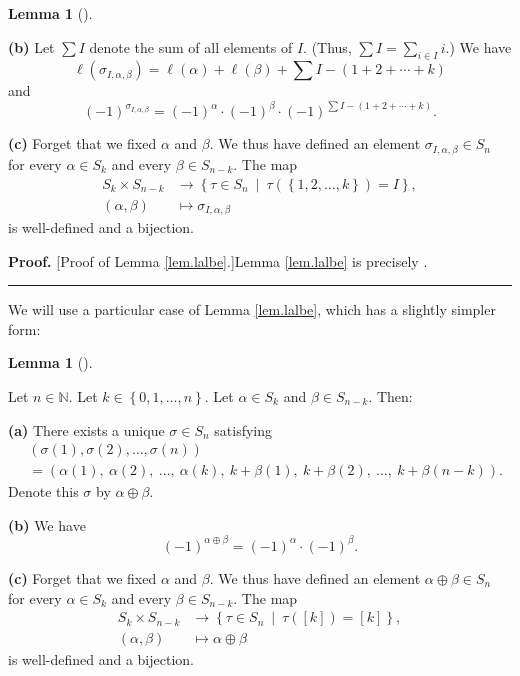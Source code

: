 \documentclass[numbers=enddot,12pt,final,onecolumn,notitlepage,english]{scrartcl}%
\theoremstyle{definition}
\newtheorem{lem}[theo]{Lemma}
\newenvironment{lemma}[1][]
{\begin{lem}[#1]\begin{leftbar}}
{\end{leftbar}\end{lem}}
\newenvironment{proof}[1][Proof]{\noindent\textbf{#1.} }{\ \rule{0.5em}{0.5em}}
\let\sumnonlimits\sum
\renewcommand{\sum}{\sumnonlimits\limits}
\newenvironment{verlong}{}{}
\begin{document}
\begin{verlong}
\begin{lemma}
\textbf{(b)} Let $\sum I$ denote the sum of all elements of $I$. (Thus, $\sum
I=\sum_{i\in I}i$.) We have%
\[
\ell\left(  \sigma_{I,\alpha,\beta}\right)  =\ell\left(  \alpha\right)
+\ell\left(  \beta\right)  +\sum I-\left(  1+2+\cdots+k\right)
\]
and%
\[
\left(  -1\right)  ^{\sigma_{I,\alpha,\beta}}=\left(  -1\right)  ^{\alpha
}\cdot\left(  -1\right)  ^{\beta}\cdot\left(  -1\right)  ^{\sum I-\left(
1+2+\cdots+k\right)  }.
\]


\textbf{(c)} Forget that we fixed $\alpha$ and $\beta$. We thus have defined
an element $\sigma_{I,\alpha,\beta}\in S_{n}$ for every $\alpha\in S_{k}$ and
every $\beta\in S_{n-k}$. The map%
\begin{align*}
S_{k}\times S_{n-k}  &  \rightarrow\left\{  \tau\in S_{n}\ \mid\ \tau\left(
\left\{  1,2,\ldots,k\right\}  \right)  =I\right\}  ,\\
\left(  \alpha,\beta\right)   &  \mapsto\sigma_{I,\alpha,\beta}%
\end{align*}
is well-defined and a bijection.
\end{lemma}

\begin{proof}
[Proof of Lemma \ref{lem.lalbe}.]Lemma \ref{lem.lalbe} is precisely
\cite[Exercise 5.14]{detnotes}.
\end{proof}

We will use a particular case of Lemma \ref{lem.lalbe}, which has a slightly
simpler form:

\begin{lemma}
\label{lem.lalbe-k}Let $n\in\mathbb{N}$. Let $k\in\left\{  0,1,\ldots
,n\right\}  $. Let $\alpha\in S_{k}$ and $\beta\in S_{n-k}$. Then:

\textbf{(a)} There exists a unique $\sigma\in S_{n}$ satisfying%
\begin{align*}
&  \left(  \sigma\left(  1\right)  ,\sigma\left(  2\right)  ,\ldots
,\sigma\left(  n\right)  \right) \\
&  =\left(  \alpha\left(  1\right)  ,\ \alpha\left(  2\right)  ,\ \ldots
,\ \alpha\left(  k\right)  ,\ k+\beta\left(  1\right)  ,\ k+\beta\left(
2\right)  ,\ \ldots,\ k+\beta\left(  n-k\right)  \right)  .
\end{align*}
Denote this $\sigma$ by $\alpha\oplus\beta$.

\textbf{(b)} We have%
\[
\left(  -1\right)  ^{\alpha\oplus\beta}=\left(  -1\right)  ^{\alpha}%
\cdot\left(  -1\right)  ^{\beta}.
\]


\textbf{(c)} Forget that we fixed $\alpha$ and $\beta$. We thus have defined
an element $\alpha\oplus\beta\in S_{n}$ for every $\alpha\in S_{k}$ and every
$\beta\in S_{n-k}$. The map%
\begin{align*}
S_{k}\times S_{n-k}  &  \rightarrow\left\{  \tau\in S_{n}\ \mid\ \tau\left(
\left[  k\right]  \right)  =\left[  k\right]  \right\}  ,\\
\left(  \alpha,\beta\right)   &  \mapsto\alpha\oplus\beta
\end{align*}
is well-defined and a bijection.
\end{lemma}


\end{verlong}
\end{document}
